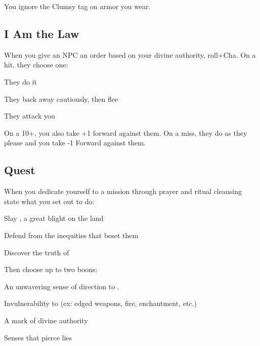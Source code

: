 You ignore the Clumsy tag on armor you wear.

 
\subsection{I Am the Law}   
 

When you give an NPC an order based on your divine authority, roll+Cha. On a hit, they choose one:

 
\startitemize[1,packed]

\item They do it

 
\item They back away cautiously, then flee

 
\item They attack you


\stopitemize
 

On a 10+, you also take +1 forward against them. On a miss, they do as they please and you take -1 Forward against them.

 
\subsection{Quest}   
 

When you dedicate yourself to a mission through prayer and ritual cleansing state what you set out to do:

 
\startitemize[1,packed]

\item Slay \thinrules[2], a great blight on the land

 
\item Defend \thinrules[2] from the inequities that beset them

 
\item Discover the truth of \thinrules[2]


\stopitemize
 

Then choose up to two boons:

 
\startitemize[1,packed]

\item An unwavering sense of direction to \thinrules[2].

 
\item Invulnerability to \thinrules[2] (ex: edged weapons, fire, enchantment, etc.)

 
\item A mark of divine authority

 
\item Senses that pierce lies

